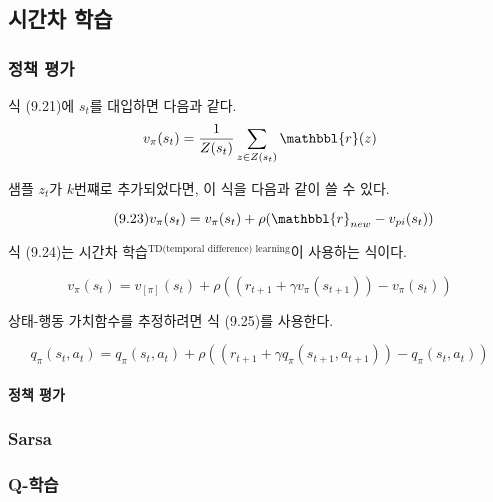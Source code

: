 \documentclass [12pt] {oblivoir}
\let\oldsubsubsection=\subsubsection
\renewcommand{\subsubsection}
{
  \filbreak
  \oldsubsubsection
}
\begin{document}
\vspace{3mm}

\subsection{시간차 학습}

\subsubsection{정책 평가}

식 (9.21)에 $s_{t}$를 대입하면 다음과 같다.
\begin{equation*}
  v_{\pi}(s_{t}) = \frac{1}{Z(s_{t})}\sum_{z \in Z(s_t)}\mathbbl{r}(z)
\end{equation*}

샘플 $z_{t}$가 $k$번쨰로 추가되었다면, 이 식을 다음과 같이 쓸 수 있다.

\begin{equation} \tag{9.23}
  v_{\pi}(s_{t}) = v_{\pi}(s_{t}) + \rho(\mathbbl{r}_{new} - v_{pi}(s_{t}))
\end{equation}

식 (9.24)는 시간차 학습$^{\text{TD(temporal difference) learning}}$이 사용하는 식이다.

\begin{equation} \tag{9.24}
  v_{\pi}(s_{t}) = v_[\pi](s_{t}) + \rho((r_{t+1} + \gamma v_{\pi}(s_{t+1})) - v_{\pi}(s_{t}))
\end{equation}

상태-행동 가치함수를 추정하려면 식 (9.25)를 사용한다.

\begin{equation} \tag{9.25}
  q_{\pi}(s_{t}, a_{t}) = q_{\pi}(s_{t}, a_{t}) + \rho((r_{t+1} + \gamma q_{\pi}(s_{t+1}, a_{t+1})) - q_{\pi}(s_{t}, a_{t}))
\end{equation}

\paragraph*{정책 평가}\mbox{}

\vspace{3mm}

\subsubsection{Sarsa}

\subsubsection{Q-학습}
\end{document}
